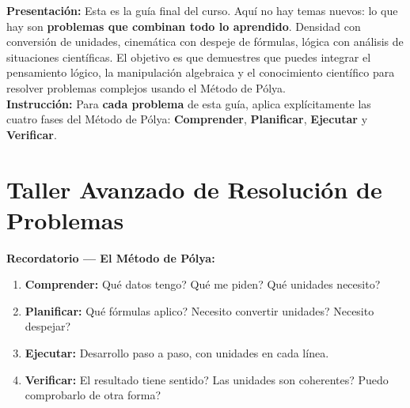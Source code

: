 \documentclass[12pt, letterpaper]{article}
\begin{document}


\vspace{4pt}
\begin{cuadroinfo}
\small
\textbf{Presentación:} Esta es la guía final del curso. Aquí no hay temas nuevos: lo que hay son \textbf{problemas que combinan todo lo aprendido}. Densidad con conversión de unidades, cinemática con despeje de fórmulas, lógica con análisis de situaciones científicas. El objetivo es que demuestres que puedes integrar el pensamiento lógico, la manipulación algebraica y el conocimiento científico para resolver problemas complejos usando el Método de Pólya.
\\[4pt]
\textbf{Instrucción:} Para \textbf{cada problema} de esta guía, aplica explícitamente las cuatro fases del Método de Pólya: \textbf{Comprender}, \textbf{Planificar}, \textbf{Ejecutar} y \textbf{Verificar}.
\end{cuadroinfo}

\vspace{8pt}

\section{Taller Avanzado de Resolución de Problemas}

\begin{cuadroadvertencia}
\textbf{Recordatorio — El Método de Pólya:}
\begin{enumerate}[label=\textbf{Fase \arabic*:}, leftmargin=*]
  \item \textbf{Comprender:} \textquestiondown Qué datos tengo? \textquestiondown Qué me piden? \textquestiondown Qué unidades necesito?
  \item \textbf{Planificar:} \textquestiondown Qué fórmulas aplico? \textquestiondown Necesito convertir unidades? \textquestiondown Necesito despejar?
  \item \textbf{Ejecutar:} Desarrollo paso a paso, con unidades en cada línea.
  \item \textbf{Verificar:} \textquestiondown El resultado tiene sentido? \textquestiondown Las unidades son coherentes? \textquestiondown Puedo comprobarlo de otra forma?
\end{enumerate}
\end{cuadroadvertencia}
\end{document}
